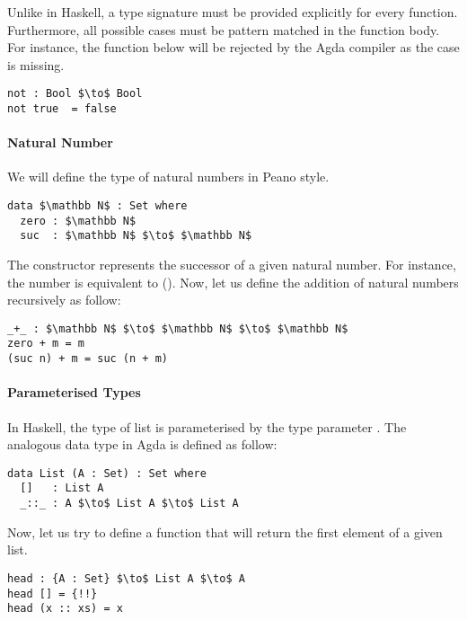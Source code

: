 \par Unlike in Haskell, a type signature must be provided explicitly for every
function. Furthermore, all possible cases must be pattern matched in
the function body. For instance, the function below will be rejected
by the Agda compiler as the case  is missing. 
\begin{lstlisting}[mathescape=true,xleftmargin=.3\textwidth]
not : Bool $\to$ Bool
not true  = false
\end{lstlisting}

\paragraph{Natural Number} We will define the type of natural
numbers in Peano style. 
\begin{lstlisting}[mathescape=true,xleftmargin=.3\textwidth]
data $\mathbb N$ : Set where
  zero : $\mathbb N$
  suc  : $\mathbb N$ $\to$ $\mathbb N$
\end{lstlisting} 

\par The constructor  represents the successor of a given
natural number. For instance, the number  is equivalent to
(). Now, let us define the addition of natural numbers recursively as follow:
\begin{lstlisting}[mathescape=true,xleftmargin=.3\textwidth]
_+_ : $\mathbb N$ $\to$ $\mathbb N$ $\to$ $\mathbb N$
zero + m = m
(suc n) + m = suc (n + m)
\end{lstlisting} 

\paragraph{Parameterised Types} In Haskell, the type of list \mb{[a]} is parameterised by the type
parameter . The analogous data type in Agda is defined as follow:
\begin{lstlisting}[mathescape=true,xleftmargin=.3\textwidth]
data List (A : Set) : Set where
  []   : List A
  _::_ : A $\to$ List A $\to$ List A
\end{lstlisting} 

\par Now, let us try to define a function that will return the first
element of a given list. 
\begin{lstlisting}[mathescape=true,xleftmargin=.3\textwidth]
head : {A : Set} $\to$ List A $\to$ A
head [] = {!!}
head (x :: xs) = x
\end{lstlisting} 

